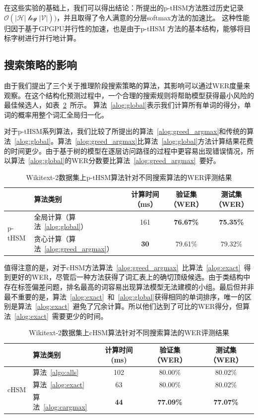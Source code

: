 在这些实验的基础上，我们可以得出结论：所提出的p-tHSM方法胜过历史记录$ \mathcal{O(| H | \log| V |)})$，并且取得了令人满意的分层softmax方法的加速比。 这种性能归因于基于GPGPU并行性的加速，也是由于p-tHSM 方法的基本结构，能够将目标字树进行并行地计算。


\subsection{搜索策略的影响}
由于我们提出了三个关于推理阶段搜索策略的算法，其影响可以通过WER度量来观察。在这个结构化预测过程中，一个合理的搜索规则将帮助模型获得最小风险的最佳候选人，如表~\ref{tab:search}~所示。 算法~\ref{alog:global}表示我们计算所有单词的得分，单词的概率用整个词汇全局归一化。

对于p-tHSM系列算法，我们比较了所提出的算法~\ref{alog:greed_argmax}和传统的算法~\ref{alog:global}。算法~\ref{alog:greed_argmax}比算法~\ref{alog:global}方法计算结果花费的时间更少。由于基于树的模型在逐层访问路径的过程中更容易出现错误情况，所以算法~\ref{alog:global}的WER分数要比算法~\ref{alog:greed_argmax}~要好。
\begin{table}[!ht]
  \centering
  \caption{Wikitext-2数据集上p-tHSM算法针对不同搜索算法的WER评测结果\label{tab:psearch2}}
\begin{tabular}{llccc}
  \toprule
        & 算法类别&计算时间（ms）&验证集（WER）& 测试集（WER）\\ \midrule
  \multirow{2}{*}{p-tHSM}  &全局计算（算法~\ref{alog:global}）&161& \textbf{76.67\%}&\textbf{75.35\%}\\
        &贪心计算（算法~\ref{alog:greed_argmax}）&\textbf{30} & 79.61\%&79.32\%\\
  \bottomrule
\end{tabular}
\end{table}

值得注意的是，对于cHSM方法算法~\ref{alog:greed_argmax}~比算法~\ref{alog:exact}~得到更好的WER，尽管后一种方法获得了词汇表上的确切顶级候选。由于类结构中存在标签偏差问题，排名最高的词容易出现算法模型无法建模的小组。最后但并非最不重要的是，算法~\ref{alog:exact}~和~\ref{alog:global}获得相同的单词排序，唯一的区别是算法~\ref{alog:exact}~避免了冗余计算。所以他们达到了可比的WER得分，但算法~\ref{alog:exact}~需要更少的时间。

\begin{table}[!ht]
  \centering
  \caption{Wikitext-2数据集上cHSM算法针对不同搜索算法的WER评测结果\label{tab:search}}
\begin{tabular}{llccc}
  \toprule
   & 算法类别&计算时间 (ms)&验证集（WER）& 测试集（WER）\\ \midrule
  \multirow{3}{*}{cHSM} &算法~\ref{algo:alls}&102& 80.00\%& 80.02\%\\
        &算法~\ref{alog:exact}&63& 80.00\%& 80.02\%\\
        &算法~\ref{alog:cargmax}&\textbf{44}&\textbf{ 77.09\%}&\textbf{ 77.07\%}\\
  \bottomrule
\end{tabular}
\end{table}


